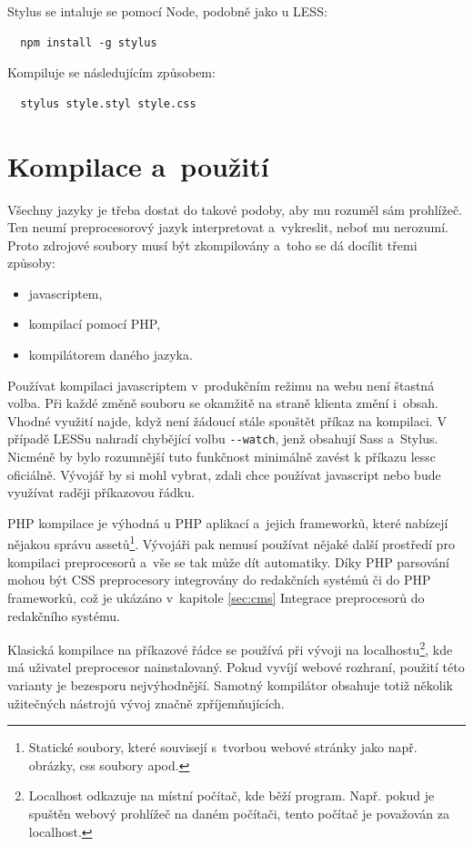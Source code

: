 \documentclass[thesis=B,czech]{FITthesis}[2012/06/26]
\begin{document}
Stylus se intaluje se pomocí Node, podobně jako u LESS:
\scriptsize
\begin{verbatim}
  npm install -g stylus
\end{verbatim}
\normalsize
Kompiluje se následujícím způsobem:
\scriptsize
\begin{verbatim}
  stylus style.styl style.css
\end{verbatim}
\normalsize


\section{Kompilace a~použití}
\label{sec:comp}


Všechny jazyky je třeba dostat do takové podoby, aby mu rozuměl sám prohlížeč. Ten neumí  preprocesorový jazyk interpretovat a~vykreslit, neboť mu nerozumí. Proto zdrojové soubory musí být zkompilovány a~toho se dá docílit třemi způsoby:


\begin{itemize}
 \item javascriptem,
 \item kompilací pomocí \gls{PHP},
 \item kompilátorem daného jazyka.
\end{itemize}

Používat kompilaci javascriptem v~produkčním režimu na webu není štastná volba. Při každé změně souboru se okamžitě na straně klienta změní i~obsah. Vhodné využití najde, když není žádoucí stále spouštět příkaz na kompilaci. V případě LESSu nahradí chybějící volbu \verb#--watch#, jenž obsahují \gls{Sass} a~Stylus. Nicméně by bylo rozumnější tuto funkčnost minimálně zavést k příkazu lessc oficiálně. Vývojář by si mohl vybrat, zdali chce používat javascript nebo bude využívat raději příkazovou řádku. 

\gls{PHP} kompilace je výhodná u \gls{PHP} aplikací a~jejich frameworků, které nabízejí nějakou správu assetů\footnote{Statické soubory, které souvisejí s~tvorbou webové stránky jako např. obrázky, css soubory apod.}. Vývojáři pak nemusí používat nějaké další prostředí pro kompilaci preprocesorů a~vše se tak může dít automatiky. Díky \gls{PHP} parsování mohou být \gls{CSS} preprocesory integrovány do redakčních systémů či do \gls{PHP} frameworků, což je ukázáno v~kapitole \ref{sec:cms} Integrace preprocesorů do redakčního systému. 


Klasická kompilace na příkazové řádce se používá při vývoji na localhostu\footnote{Localhost odkazuje na místní počítač, kde běží program. Např. pokud je spuštěn webový prohlížeč na daném počítači, tento počítač je považován za localhost.}, kde má uživatel preprocesor nainstalovaný. Pokud vyvíjí webové rozhraní, použití této varianty je bezesporu nejvýhodnější. Samotný kompilátor obsahuje totiž několik užitečných nástrojů vývoj značně zpříjemňujících. 
\end{document}

